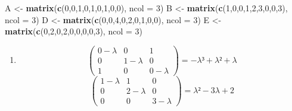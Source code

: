 \documentclass[]{article}
\newenvironment{Shaded}{\begin{snugshade}}{\end{snugshade}}
\newcommand{\DataTypeTok}[1]{\textcolor[rgb]{0.13,0.29,0.53}{#1}}
\newcommand{\DecValTok}[1]{\textcolor[rgb]{0.00,0.00,0.81}{#1}}
\newcommand{\KeywordTok}[1]{\textcolor[rgb]{0.13,0.29,0.53}{\textbf{#1}}}
\newcommand{\NormalTok}[1]{#1}
\newcommand{\StringTok}[1]{\textcolor[rgb]{0.31,0.60,0.02}{#1}}
\providecommand{\tightlist}{%
  \setlength{\itemsep}{0pt}\setlength{\parskip}{0pt}}
\begin{document}
\begin{Shaded}
\begin{Highlighting}[]
\NormalTok{A <-}\StringTok{ }\KeywordTok{matrix}\NormalTok{(}\KeywordTok{c}\NormalTok{(}\DecValTok{0}\NormalTok{,}\DecValTok{0}\NormalTok{,}\DecValTok{1}\NormalTok{,}\DecValTok{0}\NormalTok{,}\DecValTok{1}\NormalTok{,}\DecValTok{0}\NormalTok{,}\DecValTok{1}\NormalTok{,}\DecValTok{0}\NormalTok{,}\DecValTok{0}\NormalTok{), }\DataTypeTok{ncol =} \DecValTok{3}\NormalTok{)}
\NormalTok{B <-}\StringTok{ }\KeywordTok{matrix}\NormalTok{(}\KeywordTok{c}\NormalTok{(}\DecValTok{1}\NormalTok{,}\DecValTok{0}\NormalTok{,}\DecValTok{0}\NormalTok{,}\DecValTok{1}\NormalTok{,}\DecValTok{2}\NormalTok{,}\DecValTok{3}\NormalTok{,}\DecValTok{0}\NormalTok{,}\DecValTok{0}\NormalTok{,}\DecValTok{3}\NormalTok{), }\DataTypeTok{ncol =} \DecValTok{3}\NormalTok{)}
\NormalTok{D <-}\StringTok{ }\KeywordTok{matrix}\NormalTok{(}\KeywordTok{c}\NormalTok{(}\DecValTok{0}\NormalTok{,}\DecValTok{0}\NormalTok{,}\DecValTok{4}\NormalTok{,}\DecValTok{0}\NormalTok{,}\DecValTok{2}\NormalTok{,}\DecValTok{0}\NormalTok{,}\DecValTok{1}\NormalTok{,}\DecValTok{0}\NormalTok{,}\DecValTok{0}\NormalTok{), }\DataTypeTok{ncol =} \DecValTok{3}\NormalTok{)}
\NormalTok{E <-}\StringTok{ }\KeywordTok{matrix}\NormalTok{(}\KeywordTok{c}\NormalTok{(}\DecValTok{0}\NormalTok{,}\DecValTok{2}\NormalTok{,}\DecValTok{0}\NormalTok{,}\DecValTok{2}\NormalTok{,}\DecValTok{0}\NormalTok{,}\DecValTok{0}\NormalTok{,}\DecValTok{0}\NormalTok{,}\DecValTok{0}\NormalTok{,}\DecValTok{3}\NormalTok{), }\DataTypeTok{ncol =} \DecValTok{3}\NormalTok{)}
\end{Highlighting}
\end{Shaded}

\begin{enumerate}
\def\labelenumi{\alph{enumi})}
\tightlist
\item
  \[
  \begin{pmatrix}
  0-\lambda & 0 & 1 \\
  0 & 1-\lambda & 0 \\
  1 & 0 & 0-\lambda
  \end{pmatrix} = - \lambda³ + \lambda² + \lambda
  \] \[
  \begin{pmatrix}
  1-\lambda & 1 & 0 \\
  0 & 2-\lambda & 0 \\
  0 & 0 & 3-\lambda 
  \end{pmatrix} =  \lambda²- 3\lambda + 2
  \]
\end{enumerate}
\end{document}
